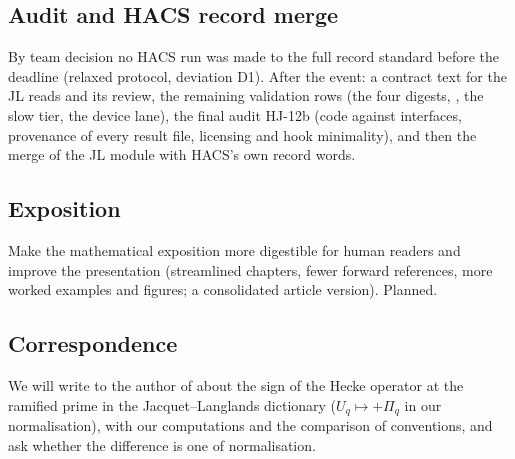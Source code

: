 \subsection{Audit and HACS record merge}\label{ss:stage2-audit}
By team decision no HACS run was made to the full record standard before the deadline (relaxed protocol, deviation D1). After
the event: a contract text for the JL reads and its review, the remaining validation rows (the four digests,
, the slow tier, the device lane), the final audit HJ-12b (code against interfaces, provenance of every
result file, licensing and hook minimality), and then the merge of the JL module with HACS's own record words.

\subsection{Exposition}\label{ss:stage2-exposition}
Make the mathematical exposition more digestible for human readers and improve the presentation (streamlined chapters,
fewer forward references, more worked examples and figures; a consolidated article version). Planned.

\subsection{Correspondence}\label{ss:stage2-hsieh}
We will write to the author of \cite{Hs} about the sign of the Hecke operator at the ramified prime in the Jacquet--Langlands
dictionary ($U_q\mapsto+\Pi_q$ in our normalisation), with our computations and the comparison of conventions, and ask
whether the difference is one of normalisation.
